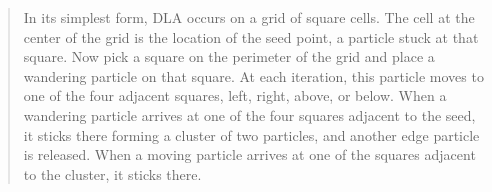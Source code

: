 


\begin{quote}
In its simplest form, DLA occurs on a grid of square
cells.  The cell at the center of the grid is the location of the
seed point, a particle stuck at that square.  Now pick a square on the
perimeter of the grid and place a wandering particle on that square.
At each iteration, this particle moves to one of the four
adjacent squares, left, right, above, or below.
When a wandering particle arrives at one of the four squares adjacent
to the seed, it sticks there forming a cluster of two particles, and
another edge particle is released.  When a moving particle arrives at
one of the squares adjacent to the cluster, it sticks there.
\end{quote}

